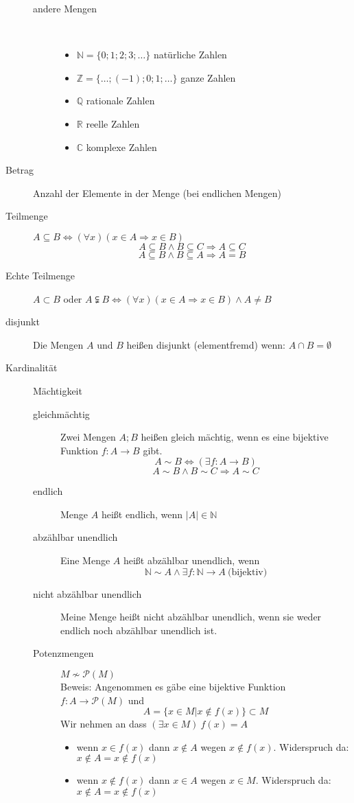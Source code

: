 \begin{description}
\begin{description}
        \item[andere Mengen] \
        \begin{itemize}
            \item $\mathbb{N} = \lbrace 0;1;2;3;\dots \rbrace$ natürliche Zahlen
            \item $\mathbb{Z} = \lbrace \dots; (-1);0;1;\dots \rbrace$ ganze Zahlen
            \item $\mathbb{Q}$ rationale Zahlen
            \item $\mathbb{R}$ reelle Zahlen
            \item $\mathbb{C}$ komplexe Zahlen
        \end{itemize}
    \end{description}
    \item[Betrag] Anzahl der Elemente in der Menge (bei endlichen Mengen)
    \item[Teilmenge] $A \subseteq B \Leftrightarrow (\forall x)(x \in A \Rightarrow x \in B)$
    $$A \subseteq B \wedge B \subseteq C \Rightarrow A \subseteq C$$
    $$A \subseteq B \wedge B \subseteq A \Rightarrow A = B$$
    \item[Echte Teilmenge] $A \subset B$ oder $A \subsetneqq B \Leftrightarrow (\forall x)(x \in A \Rightarrow x \in B) \wedge A \not = B $
    \item[disjunkt] Die Mengen $A$ und $B$ heißen disjunkt (elementfremd) wenn: $A \cap B = \emptyset$
    \item[Kardinalität] Mächtigkeit
    \begin{description}
        \item[gleichmächtig] Zwei Mengen $A;B$ heißen gleich mächtig, wenn es eine bijektive Funktion $f : A \longrightarrow B$ gibt.
        $$A \sim B \Leftrightarrow (\exists f : A \longrightarrow B)$$
        $$A \sim B \wedge B \sim C \Rightarrow A \sim C$$
        \item[endlich] Menge $A$ heißt endlich, wenn $|A| \in \mathbb{N}$
        \item[abzählbar unendlich ] Eine Menge $A$ heißt abzählbar unendlich, wenn $$\mathbb{N} \sim A \wedge \exists f : \mathbb{N} \longrightarrow A\ \textrm{(bijektiv)}$$
        \item[nicht abzählbar unendlich] Meine Menge heißt nicht abzählbar unendlich, wenn sie weder endlich noch abzählbar unendlich ist.
        \item[Potenzmengen]$M \not \sim \mathcal{P}(M)$\\ Beweis:
        Angenommen es gäbe eine bijektive Funktion $f : A \longrightarrow \mathcal{P}(M)$ und
        $$A = \lbrace x \in M | x \not \in f(x) \rbrace \subset M$$
        Wir nehmen an dass $(\exists x \in M)\ f(x) = A$
        \begin{itemize}
            \item wenn $x \in f(x) $ dann $x \not \in A$ wegen $x \not \in f(x)$. Widerspruch da: $x \not \in A = x \not \in f(x)$
            \item wenn $x \not \in f(x)$ dann $x \in A$ wegen $x \in M$. Widerspruch da: $x \not \in A = x \not \in f(x)$
        \end{itemize}
    \end{description}
\end{description}
